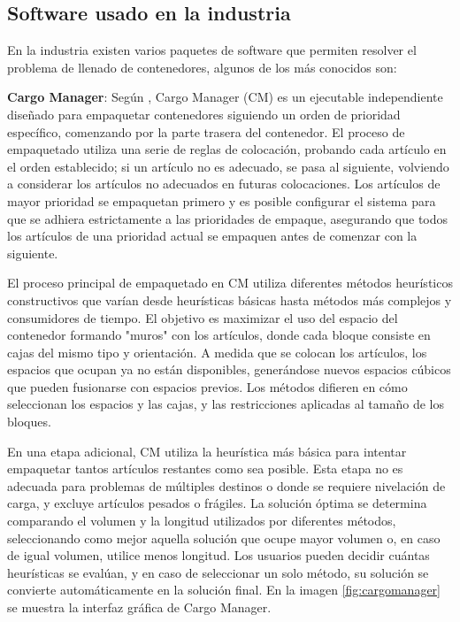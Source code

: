 \documentclass[openany]{article}
\begin{document}
\subsection{Software usado en la industria}

En la industria existen varios paquetes de software que permiten resolver el problema de llenado de contenedores, algunos de los más conocidos son:

\textbf{Cargo Manager}: Según \textcite{zhao2017three}, Cargo Manager (CM) es un ejecutable independiente diseñado para empaquetar contenedores siguiendo un orden de prioridad específico, comenzando por la parte trasera del contenedor. El proceso de empaquetado utiliza una serie de reglas de colocación, probando cada artículo en el orden establecido; si un artículo no es adecuado, se pasa al siguiente, volviendo a considerar los artículos no adecuados en futuras colocaciones. Los artículos de mayor prioridad se empaquetan primero y es posible configurar el sistema para que se adhiera estrictamente a las prioridades de empaque, asegurando que todos los artículos de una prioridad actual se empaquen antes de comenzar con la siguiente.

El proceso principal de empaquetado en CM utiliza diferentes métodos heurísticos constructivos que varían desde heurísticas básicas hasta métodos más complejos y consumidores de tiempo. El objetivo es maximizar el uso del espacio del contenedor formando "muros" con los artículos, donde cada bloque consiste en cajas del mismo tipo y orientación. A medida que se colocan los artículos, los espacios que ocupan ya no están disponibles, generándose nuevos espacios cúbicos que pueden fusionarse con espacios previos. Los métodos difieren en cómo seleccionan los espacios y las cajas, y las restricciones aplicadas al tamaño de los bloques.

En una etapa adicional, CM utiliza la heurística más básica para intentar empaquetar tantos artículos restantes como sea posible. Esta etapa no es adecuada para problemas de múltiples destinos o donde se requiere nivelación de carga, y excluye artículos pesados o frágiles. La solución óptima se determina comparando el volumen y la longitud utilizados por diferentes métodos, seleccionando como mejor aquella solución que ocupe mayor volumen o, en caso de igual volumen, utilice menos longitud. Los usuarios pueden decidir cuántas heurísticas se evalúan, y en caso de seleccionar un solo método, su solución se convierte automáticamente en la solución final. En la imagen \ref{fig:cargomanager} se muestra la interfaz gráfica de Cargo Manager.
\end{document}
